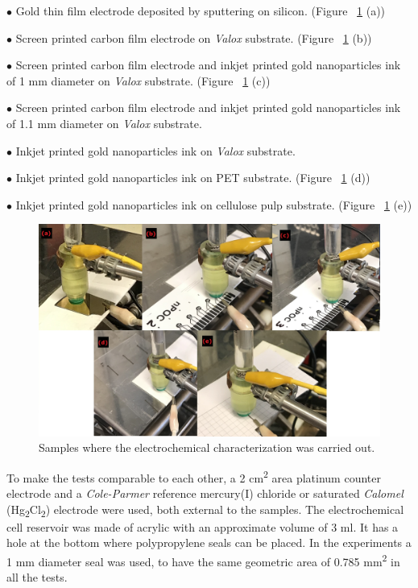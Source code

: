 $\bullet$ Gold thin film electrode deposited by sputtering on silicon. (Figure ~\ref{fig:Figura_pruebas_muestras} (a))

$\bullet$ Screen printed carbon film electrode on \textit{Valox} substrate. (Figure ~\ref{fig:Figura_pruebas_muestras} (b))

$\bullet$ Screen printed carbon film electrode and inkjet printed gold nanoparticles ink of 1 mm diameter on \textit{Valox} substrate. (Figure ~\ref{fig:Figura_pruebas_muestras} (c))

$\bullet$ Screen printed carbon film electrode and inkjet printed gold nanoparticles ink of 1.1 mm diameter on \textit{Valox} substrate.

$\bullet$ Inkjet printed gold nanoparticles ink on \textit{Valox} substrate.

$\bullet$ Inkjet printed gold nanoparticles ink on PET substrate. (Figure ~\ref{fig:Figura_pruebas_muestras} (d))

$\bullet$ Inkjet printed gold nanoparticles ink on cellulose pulp substrate. (Figure ~\ref{fig:Figura_pruebas_muestras} (e))

\begin{figure}[H]
  \centering
    \includegraphics[width=1\textwidth]{Figures/Figura_pruebas_muestras}
  \caption{Samples where the electrochemical characterization was carried out.}
  \label{fig:Figura_pruebas_muestras}
\end{figure}
To make the tests comparable to each other, a 2 cm\textsuperscript{2} area platinum counter electrode and a \textit{Cole-Parmer} reference mercury(I) chloride or saturated \textit{Calomel} (Hg\textsubscript{2}Cl\textsubscript{2}) electrode were used, both external to the samples. The electrochemical cell reservoir was made of acrylic with an approximate volume of 3 ml. It has a hole at the bottom where polypropylene seals can be placed. In the experiments a 1 mm diameter seal was used, to have the same geometric area of 0.785 mm\textsuperscript{2} in all the tests.

